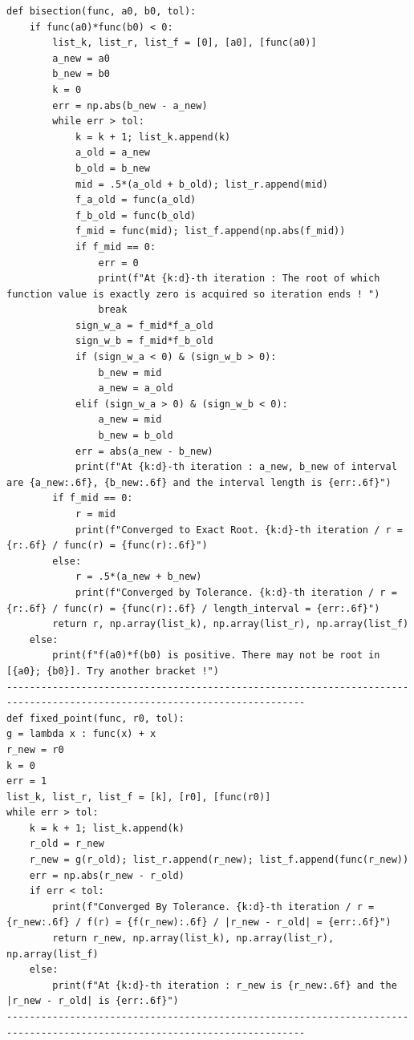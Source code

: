 \documentclass{article} %
\begin{document}
\begin{verbatim}
def bisection(func, a0, b0, tol):
    if func(a0)*func(b0) < 0:
        list_k, list_r, list_f = [0], [a0], [func(a0)]
        a_new = a0
        b_new = b0
        k = 0
        err = np.abs(b_new - a_new)
        while err > tol:
            k = k + 1; list_k.append(k)
            a_old = a_new
            b_old = b_new
            mid = .5*(a_old + b_old); list_r.append(mid)
            f_a_old = func(a_old)
            f_b_old = func(b_old)
            f_mid = func(mid); list_f.append(np.abs(f_mid))
            if f_mid == 0:
                err = 0
                print(f"At {k:d}-th iteration : The root of which function value is exactly zero is acquired so iteration ends ! ")
                break
            sign_w_a = f_mid*f_a_old
            sign_w_b = f_mid*f_b_old
            if (sign_w_a < 0) & (sign_w_b > 0):
                b_new = mid
                a_new = a_old
            elif (sign_w_a > 0) & (sign_w_b < 0):
                a_new = mid
                b_new = b_old
            err = abs(a_new - b_new)
            print(f"At {k:d}-th iteration : a_new, b_new of interval are {a_new:.6f}, {b_new:.6f} and the interval length is {err:.6f}")
        if f_mid == 0:
            r = mid
            print(f"Converged to Exact Root. {k:d}-th iteration / r = {r:.6f} / func(r) = {func(r):.6f}")
        else:
            r = .5*(a_new + b_new)
            print(f"Converged by Tolerance. {k:d}-th iteration / r = {r:.6f} / func(r) = {func(r):.6f} / length_interval = {err:.6f}")
        return r, np.array(list_k), np.array(list_r), np.array(list_f)
    else:
        print(f"f(a0)*f(b0) is positive. There may not be root in [{a0}; {b0}]. Try another bracket !")
--------------------------------------------------------------------------------------------------------------------------
def fixed_point(func, r0, tol):
g = lambda x : func(x) + x
r_new = r0
k = 0
err = 1
list_k, list_r, list_f = [k], [r0], [func(r0)]
while err > tol:
    k = k + 1; list_k.append(k)
    r_old = r_new
    r_new = g(r_old); list_r.append(r_new); list_f.append(func(r_new))
    err = np.abs(r_new - r_old)
    if err < tol:
        print(f"Converged By Tolerance. {k:d}-th iteration / r = {r_new:.6f} / f(r) = {f(r_new):.6f} / |r_new - r_old| = {err:.6f}")
        return r_new, np.array(list_k), np.array(list_r), np.array(list_f)
    else:
        print(f"At {k:d}-th iteration : r_new is {r_new:.6f} and the |r_new - r_old| is {err:.6f}")
--------------------------------------------------------------------------------------------------------------------------

\end{verbatim}
\end{document}
